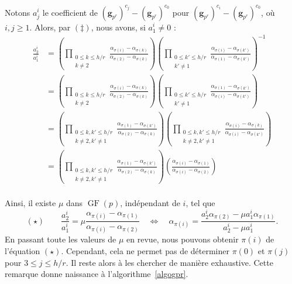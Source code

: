 \documentclass[a4paper, titlepage, 11pt]{article}
\theoremstyle{definition}
\theoremstyle{remark}
\def\gf{\operatorname{GF}}
\def\mbf#1{\mathbf{#1}}
\begin{document}
Notons $a_j^i$ le coefficient de $(\mbf g_{p^r})^{c_{{j}}} - (\mbf g_{p^r})^{c_{0}}$ pour $(\mbf g_{p^r})^{c_{i}} - (\mbf g_{p^r})^{c_{0}}$, où $i , j\geqslant 1$. Alors, par $(\ddagger)$, nous avons, si $a_1^i \neq 0$ :
\begin{align*}
\frac{a_2^i}{a_1^i} &= \left(\prod_{\substack{0\leqslant k\leqslant h/r \\ k \neq 2}} \frac{\alpha_{\sigma(i)}-\alpha_{\sigma(k)}}{\alpha_{\sigma(2)}-\alpha_{\sigma(k)}} \right)\left(\prod_{\substack{0\leqslant k'\leqslant h/r \\ k' \neq 1}} \frac{\alpha_{\sigma(i)}-\alpha_{\sigma({k'})}}{\alpha_{\sigma(1)}-\alpha_{\sigma({k'})}} \right)^{-1} \\
&= \left(\prod_{\substack{0\leqslant k\leqslant h/r \\ k \neq 2}} \frac{\alpha_{\sigma(i)}-\alpha_{\sigma(k)}}{\alpha_{\sigma(2)}-\alpha_{\sigma(k)}} \right)\left(\prod_{\substack{0\leqslant k' \leqslant h/r \\ k' \neq 1}} \frac{\alpha_{\sigma(1)}-\alpha_{\sigma({k'})}}{\alpha_{\sigma(i)}-\alpha_{\sigma({k'})}} \right) \\
&= \left(\prod_{\substack{0\leqslant k, k'\leqslant h/r \\ k \neq 2, k' \neq 1}} \frac{\alpha_{\sigma(1)}-\alpha_{\sigma({k'})}}{\alpha_{\sigma(2)}-\alpha_{\sigma(k)}} \right) \left(\prod_{\substack{0\leqslant k, k'\leqslant h/r \\ k \neq 2, k' \neq 1}} \frac{\alpha_{\sigma(i)}-\alpha_{\sigma(k)}}{\alpha_{\sigma(i)}-\alpha_{\sigma({k'})}} \right) \\
&= \left(\prod_{\substack{0\leqslant k, k'\leqslant h/r \\ k \neq 2, k' \neq 1}} \frac{\alpha_{\sigma(1)}-\alpha_{\sigma({k'})}}{\alpha_{\sigma(2)}-\alpha_{\sigma(k)}} \right) \left(\frac{\alpha_{\sigma(i)}-\alpha_{\sigma(1)}}{\alpha_{\sigma(i)}-\alpha_{\sigma(2)}} \right) \\
\end{align*}

Ainsi, il existe $\mu$ dans $\gf(p)$, indépendant de $i$, tel que 
$$(\star) \qquad\frac{a_2^i}{a_1^i} = \mu \frac{\alpha_{\pi(i)}-\alpha_{\pi(1)}}{\alpha_{\pi(i)}-\alpha_{\pi(2)}}\quad\Leftrightarrow\quad
\alpha_{\pi(i)} = \frac{a_2^i\alpha_{\pi(2)}-\mu a_1^i\alpha_{\pi(1)}}{a_2^i-\mu a_1^i}.$$
En passant toute les valeurs de $\mu$ en revue, nous pouvons obtenir $\pi(i)$ de l'équation $(\star)$. Cependant, cela ne permet pas de déterminer $\pi(0)$ et $\pi(j)$ pour $3 \leqslant j \leqslant h/r$. Il reste alors à les chercher de manière exhaustive. Cette remarque donne naissance à l'algorithme~\ref{algogpr}.
\end{document}

